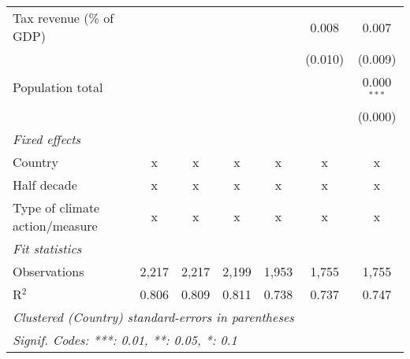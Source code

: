 \begin{tabular}{lcccccc}
   Tax revenue (\% of GDP)                    &         &              &                &               & 0.008         & 0.007\\   
                                              &         &              &                &               & (0.010)       & (0.009)\\   
   Population total                           &         &              &                &               &               & 0.000$^{***}$\\   
                                              &         &              &                &               &               & (0.000)\\   
   \emph{Fixed effects}\\
   Country                                    & x       & x            & x              & x             & x             & x\\  
   Half decade                                & x       & x            & x              & x             & x             & x\\  
   Type of climate action/measure             & x       & x            & x              & x             & x             & x\\  
   \midrule \emph{Fit statistics}\\
   Observations                               & 2,217   & 2,217        & 2,199          & 1,953         & 1,755         & 1,755\\  
   R$^2$                                      & 0.806   & 0.809        & 0.811          & 0.738         & 0.737         & 0.747\\  
   \midrule
   \multicolumn{7}{l}{\emph{Clustered (Country) standard-errors in parentheses}}\\
   \multicolumn{7}{l}{\emph{Signif. Codes: ***: 0.01, **: 0.05, *: 0.1}}\\
\end{tabular}
\par\endgroup


